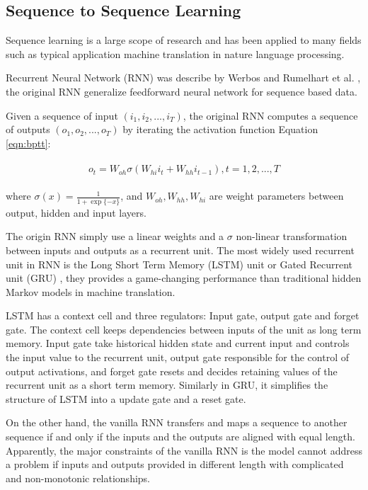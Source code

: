 \subsection{Sequence to Sequence Learning}
\label{sec:seq-learn}

Sequence learning is a large scope of research and has been applied to many fields such as 
typical application machine translation in nature language processing. 

Recurrent Neural Network (RNN) was describe by Werbos \cite{werbos1990rnn} and 
Rumelhart et al. \cite{Rumelhart:1988:LRB:65669.104451}, the original RNN 
generalize feedforward neural network for sequence based data.

Given a sequence of input $(i_1, i_2, ..., i_T)$, the original RNN computes a
sequence of outputs $(o_1, o_2, ..., o_T)$ 
by iterating the activation function Equation \ref{eqn:bptt}:

\begin{align}
\label{eqn:bptt}
\begin{split}
    o_t = W_{oh} \sigma \left( W_{hi}i_{t} + W_{hh}i_{t-1}\right), t=1,2,...,T
\end{split}
\end{align}

where $\sigma(x) = \frac{1}{1+\exp\{-x\}}$,
and $W_{oh}, W_{hh}, W_{hi}$ are weight parameters between output, hidden and input layers.

The origin RNN simply use a linear weights and a $\sigma$ non-linear transformation between 
inputs and outputs as a recurrent unit. The most widely used recurrent unit in RNN is the
Long Short Term Memory (LSTM) unit \cite{hochreiter1997lstm} 
or Gated Recurrent unit (GRU) \cite{DBLP:journals/corr/ChoMGBSB14}, they provides a game-changing
performance than traditional hidden Markov models in machine translation\cite{DBLP:journals/corr/abs-1901-01122}.

LSTM has a context cell and three regulators: Input gate, 
output gate and forget gate.
The context cell keeps dependencies between inputs of the unit as long term memory. 
Input gate take historical hidden state and current input and controls the input value to
the recurrent unit, output gate responsible for the control of output activations, and
forget gate resets and decides retaining values of the recurrent unit as a short term memory.
Similarly in GRU, it simplifies the structure of LSTM into a update gate and a reset gate.

On the other hand, the vanilla RNN transfers and maps a sequence to another sequence if and only if the inputs
and the outputs are aligned with equal length. Apparently, the major constraints of the vanilla RNN
is the model cannot address a problem if inputs and outputs provided in different length with 
complicated and non-monotonic relationships.

